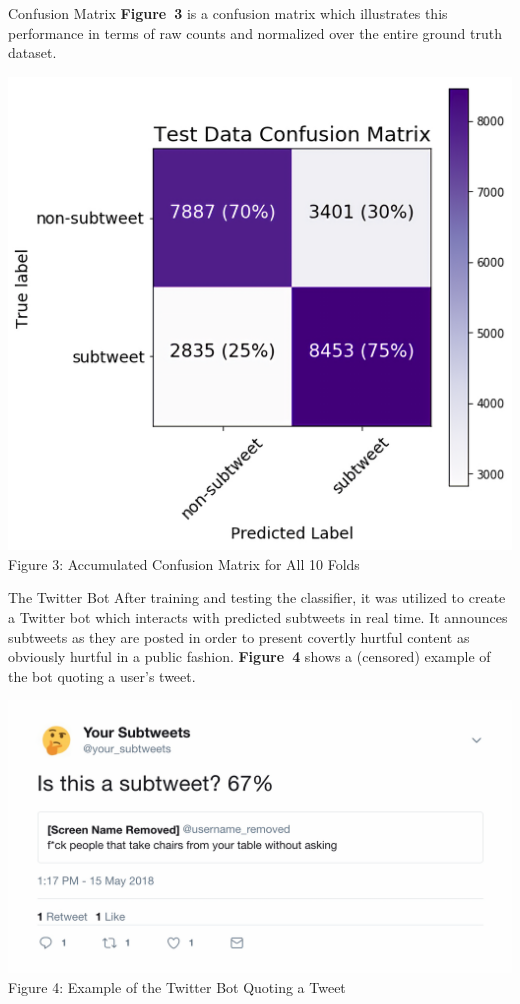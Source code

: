 \documentclass[12pt]{article}
\begin{document}
\begin{posterbard}
\begin{posterboxtitle}{Confusion Matrix}
\noindent
\textbf{Figure~3} is a confusion matrix which illustrates this performance in terms of raw counts and normalized over the entire ground truth dataset.
\begin{center}
\includegraphics[width=\textwidth]{confusion_matrix_new.png}\\
Figure 3: Accumulated Confusion Matrix for All 10 Folds
\end{center}

\end{posterboxtitle}

\begin{posterboxtitle}{The Twitter Bot}
After training and testing the classifier, it was utilized to create a Twitter bot which interacts with \textcolor{WildStrawberry}{predicted subtweets} in real time. It announces subtweets as they are posted in order to present covertly hurtful content as obviously hurtful in a public fashion. \textbf{Figure~4} shows a (censored) example of the bot quoting a user's tweet.
\begin{center}
\includegraphics[width=\textwidth]{quote_example_new.png}\\
Figure 4: Example of the Twitter Bot Quoting a Tweet
\end{center}
\end{posterboxtitle}


\end{posterbard}
\end{document}
